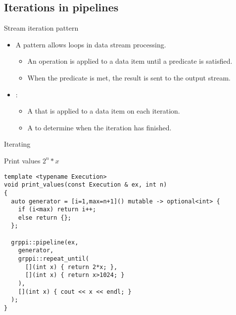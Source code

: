 \subsection{Iterations in pipelines}

\begin{frame}[t]{Stream iteration pattern}
\begin{itemize}
  \item A  pattern allows loops in data stream processing.
    \begin{itemize}
      \item An operation is applied to a data item until a predicate is satisfied.
      \item When the predicate is met, the result is sent to the output stream.
    \end{itemize}
  \vfill\pause
  \item {}:
    \begin{itemize}
      \item A  that is applied to a data item on each iteration.
      \item A  to determine when the iteration has finished.
    \end{itemize}
\end{itemize}
\end{frame}

\begin{frame}[t,fragile]{Iterating}
\begin{block}{Print values $2^n*x$}
\begin{lstlisting}
template <typename Execution>
void print_values(const Execution & ex, int n)
{
  auto generator = [i=1,max=n+1]() mutable -> optional<int> {
    if (i<max) return i++;
    else return {};
  };

  grppi::pipeline(ex,
    generator,
    grppi::repeat_until(
      [](int x) { return 2*x; },
      [](int x) { return x>1024; }
    ),
    [](int x) { cout << x << endl; }
  );
}
\end{lstlisting}
\end{block}
\end{frame}
